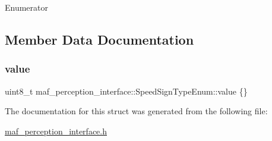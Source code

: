 \begin{DoxyEnumFields}{Enumerator}
\end{DoxyEnumFields}


\subsection{Member Data Documentation}
\mbox{\label{structmaf__perception__interface_1_1SpeedSignTypeEnum_a460c2867853288f9826c2bd9daf5dcf6}} 
\subsubsection{\texorpdfstring{value}{value}}
{\footnotesize\ttfamily uint8\+\_\+t maf\+\_\+perception\+\_\+interface\+::\+Speed\+Sign\+Type\+Enum\+::value \{\}}



The documentation for this struct was generated from the following file\+:\begin{DoxyCompactItemize}
\item 
\hyperlink{maf__perception__interface_8h}{maf\+\_\+perception\+\_\+interface.\+h}\end{DoxyCompactItemize}
